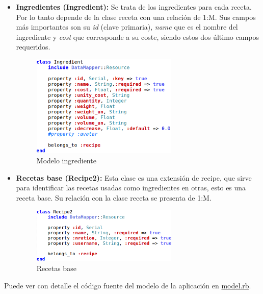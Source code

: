 \begin{itemize}
	\item \textbf{Ingredientes (Ingredient):} Se trata de los ingredientes para cada receta. Por lo tanto depende de la clase receta con una relación de 1:M. Sus campos más importantes son su \emph{id} (clave primaria), \emph{name} que es el nombre del ingrediente y \emph{cost} que corresponde a su coste, siendo estos dos último campos requeridos.

	\begin{figure}[H]
		\centering
		\includegraphics[width=7cm]{./images/chefmanagement-model-ingredient.png}
		\caption{Modelo ingrediente} \label{fig:chefmanagement-model-inredient}
	\end{figure}

	\item \textbf{Recetas base (Recipe2):} Esta clase es una extensión de recipe, que sirve para identificar las recetas usadas como ingredientes en otras, esto es una receta base. Su relación con la clase receta se presenta de 1:M.

	\begin{figure}[H]
		\centering
		\includegraphics[width=7cm]{./images/chefmanagement-model-recipe2.png}
		\caption{Recetas base} \label{fig:chefmanagement-model-recipe2}
	\end{figure}

\end{itemize}

Puede ver con detalle el código fuente del modelo de la aplicación en \href{https://github.com/alu0100207385/ChefManagement/blob/master/app/models/model.rb}{model.rb}.

%
